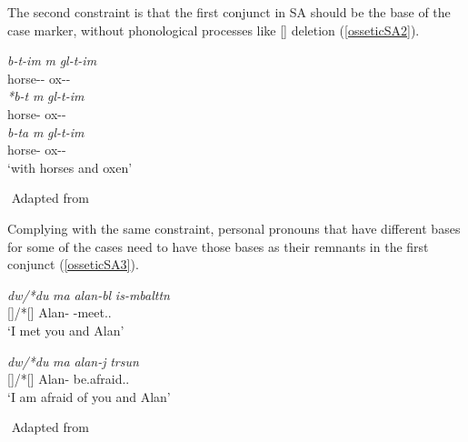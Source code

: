 The second constraint is that the first conjunct in SA should be the base of the case marker, without phonological processes like [\textturna] deletion (\ref{osseticSA2}).

\begin{exe}
    \ex \label{osseticSA2}
    \begin{xlist}
    \ex 
    \gll 
    \textit{b\textturna\textchi-t-im\textturna} \textit{\textturna m\textturna\footnotemark} \textit{g\textturna l-t-im\textturna} \\ horse-{\Pl}-{\Com} {\And} ox-{\Pl}-{\Com} \\
    
    \ex 
    \gll 
    \textit{*b\textturna\textchi-t} \textit{\textturna m\textturna} \textit{g\textturna l-t-im\textturna} \\ horse-{\Pl} {\And} ox-{\Pl}-{\Com} \\
    
    \ex 
    \gll 
    \textit{b\textturna\textchi-ta} \textit{\textturna m\textturna} \textit{g\textturna l-t-im\textturna} \\ horse-{\Pl} {\And} ox-{\Pl}-{\Com} \\
    \glt `with horses and oxen'
    \end{xlist}
    ${}$ \hfill Adapted from \cite{erschler2012suspended}
\end{exe}


Complying with the same constraint, personal pronouns that have different bases for some of the cases need to have those bases as their remnants in the first conjunct (\ref{osseticSA3}).

\begin{exe}
    \ex \label{osseticSA3}
    \begin{xlist}
        \ex \gll 
        \textit{d\textturna w/*du} \textit{\textturna ma} \textit{alan-b\textturna l} \textit{is-\textturna mbaltt\textturna n} \\ {\Second}{\Sg}[{\Obl}]/*{\Second}{\Sg}[{\Nom}] {\And} Alan-{\Sup} {\Prv}-meet.{\Pst}.{\First}{\Sg} \\
        \glt `I met you and Alan'
        
        \ex \gll 
        \textit{d\textturna w/*du} \textit{\textturna ma} \textit{alan-\textturna j} \textit{t\textturna rsun} \\ {\Second}{\Sg}[{\Obl}]/*{\Second}{\Sg}[{\Nom}] {\And} Alan-{\Abl} be.afraid.{\Prs}.{\First}{\Sg} \\
        \glt `I am afraid of you and Alan'
    \end{xlist}
    ${}$ \hfill Adapted from \cite{erschler2012suspended}
\end{exe}


